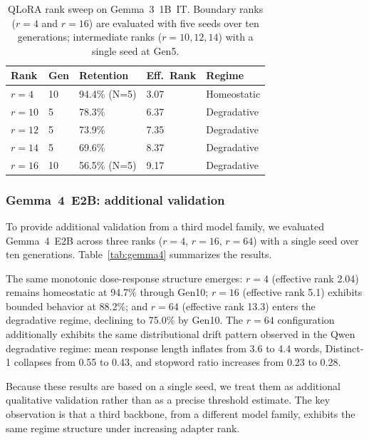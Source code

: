 \documentclass[a4paper,fleqn]{cas-dc}
\begin{document}
\begin{table}[width=.95\linewidth,cols=5,pos=htbp]
\caption{QLoRA rank sweep on Gemma~3~1B~IT. Boundary ranks ($r=4$ and $r=16$)
are evaluated with five seeds over ten generations; intermediate ranks
($r=10,12,14$) with a single seed at Gen5.}\label{tab:gemma3}
\begin{tabular*}{\tblwidth}{@{} lllll@{} }
\toprule
Rank & Gen & Retention & Eff.\ Rank & Regime \\
\midrule
$r=4$   & 10 & 94.4\% (N=5) & 3.07  & Homeostatic \\
$r=10$  & 5  & 78.3\%       & 6.37  & Degradative \\
$r=12$  & 5  & 73.9\%       & 7.35  & Degradative \\
$r=14$  & 5  & 69.6\%       & 8.37  & Degradative \\
$r=16$  & 10 & 56.5\% (N=5) & 9.17  & Degradative \\
\bottomrule
\end{tabular*}
\end{table}

\subsubsection{Gemma~4~E2B: additional validation}

To provide additional validation from a third model family, we evaluated
Gemma~4~E2B across three ranks ($r=4$, $r=16$, $r=64$) with a single seed
over ten generations. Table~\ref{tab:gemma4} summarizes the results.

The same monotonic dose-response structure emerges: $r=4$ (effective rank 2.04)
remains homeostatic at 94.7\% through Gen10; $r=16$ (effective rank 5.1)
exhibits bounded behavior at 88.2\%; and $r=64$ (effective rank 13.3)
enters the degradative regime, declining to 75.0\% by Gen10. The $r=64$
configuration additionally exhibits the same distributional drift pattern
observed in the Qwen degradative regime: mean response length inflates from
3.6 to 4.4 words, Distinct-1 collapses from 0.55 to 0.43, and stopword ratio
increases from 0.23 to 0.28.

Because these results are based on a single seed, we treat them as additional
qualitative validation rather than as a precise threshold estimate. The key
observation is that a third backbone, from a different model family, exhibits
the same regime structure under increasing adapter rank.
\end{document}
